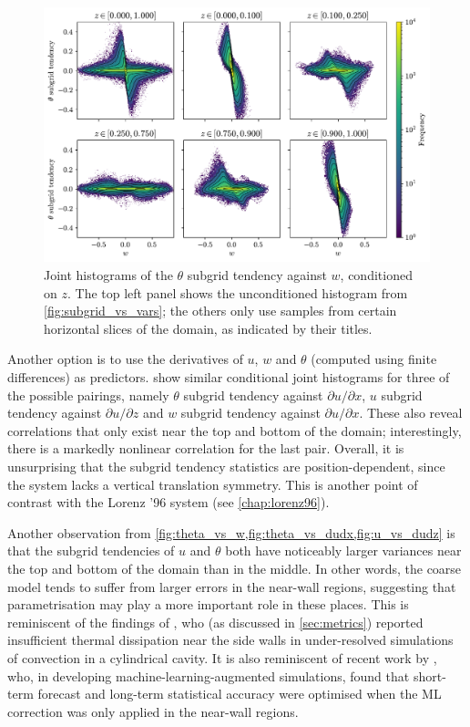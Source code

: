 \documentclass[../main.tex]{subfiles}
\begin{document}
\begin{figure}[ht]
    \centering
    \includegraphics[width=0.9\linewidth]{figures/theta_vs_w.pdf}
    \caption{
        Joint histograms of the $\theta$ subgrid tendency against $w$,
        conditioned on $z$. The top left panel shows the unconditioned
        histogram from \cref{fig:subgrid_vs_vars}; the others only use samples
        from certain horizontal slices of the domain, as indicated by their
        titles.
    }
    \label{fig:theta_vs_w}
\end{figure}

Another option is to use the derivatives of $u$, $w$ and $\theta$ (computed
using finite differences) as predictors.
 show similar conditional joint
histograms for three of the possible pairings, namely $\theta$ subgrid tendency
against $\partial u/\partial x$, $u$ subgrid tendency against $\partial
u/\partial z$ and $w$ subgrid tendency against $\partial u/\partial x$. These
also reveal correlations that only exist near the top and bottom of the domain;
interestingly, there is a markedly nonlinear correlation for the last pair.
Overall, it is unsurprising that the subgrid tendency statistics are
position-dependent, since the system lacks a vertical translation symmetry.
This is another point of contrast with the Lorenz '96 system (see
\cref{chap:lorenz96}).

Another observation from \cref{fig:theta_vs_w,fig:theta_vs_dudx,fig:u_vs_dudz}
is that the subgrid tendencies of $u$ and $\theta$ both have noticeably larger
variances near the top and bottom of the domain than in the middle. In other
words, the coarse model tends to suffer from larger errors in the near-wall
regions, suggesting that parametrisation may play a more important role in
these places. This is reminiscent of the findings of \textcite{stevens2010},
who (as discussed in \cref{sec:metrics}) reported insufficient thermal
dissipation near the side walls in under-resolved simulations of \rb{}
convection in a cylindrical cavity. It is also reminiscent of recent work by
\textcite{alieva2023}, who, in developing machine-learning-augmented \rb{}
simulations, found that short-term forecast and long-term statistical accuracy
were optimised when the ML correction was only applied in the near-wall
regions.
\end{document}
